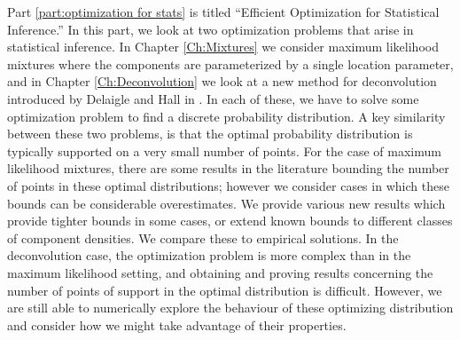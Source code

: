 Part \ref{part:optimization for stats} is titled ``Efficient Optimization for Statistical Inference.'' In this part, we look at two optimization problems that arise in statistical inference. In Chapter \ref{Ch:Mixtures} we consider maximum likelihood mixtures where the components are parameterized by a single location parameter, and in Chapter \ref{Ch:Deconvolution} we look at a new method for deconvolution introduced by Delaigle and Hall in \cite{Delaigle2016-la}. In each of these, we have to solve some optimization problem to find a discrete probability distribution. A key similarity between these two problems, is that the optimal probability distribution is typically supported on a very small number of points. 
For the case of maximum likelihood mixtures, there are some results in the literature bounding the number of points in these optimal distributions; however we consider cases in which these bounds can be considerable overestimates. We provide various new results which provide tighter bounds in some cases, or extend known bounds to different classes of component densities. We compare these to empirical solutions.
In the deconvolution case, the optimization problem is more complex than in the maximum likelihood setting, and obtaining and proving results concerning the number of points of support in the optimal distribution is difficult. However, we are still able to numerically explore the behaviour of these optimizing distribution and consider how we might take advantage of their properties.
